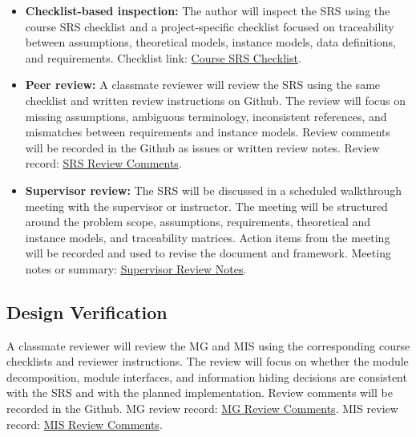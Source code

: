 \documentclass[12pt, titlepage]{article}
\begin{document}
\begin{itemize}
    \item \textbf{Checklist-based inspection:} The author will inspect the SRS using the course SRS checklist and a project-specific checklist focused on traceability between assumptions, theoretical models, instance models, data definitions, and requirements.  
    Checklist link: \href{https://github.com/Krozix-2026/cas741-speech-trf/tree/main/docs/Checklists}{Course SRS Checklist}.

    \item \textbf{Peer review:} A classmate reviewer will review the SRS using the same checklist and written review instructions on Github. The review will focus on missing assumptions, ambiguous terminology, inconsistent references, and mismatches between requirements and instance models. Review comments will be recorded in the Github as issues or written review notes.   
    Review record: \href{https://github.com/Krozix-2026/cas741-speech-trf/issues}{SRS Review Comments}.

    \item \textbf{Supervisor review:} The SRS will be discussed in a scheduled walkthrough meeting with the supervisor or instructor. The meeting will be structured around the problem scope, assumptions, requirements, theoretical and instance models, and traceability matrices. Action items from the meeting will be recorded and used to revise the document and framework.  
    Meeting notes or summary: \href{https://docs.google.com/document/d/1MB4mZMU3GUZd5zrZ7lYlEK12WPLXRYUR8ijGftzUFMo/edit?tab=t.0}{Supervisor Review Notes}.
\end{itemize}







\subsection{Design Verification}




A classmate reviewer will review the MG and MIS using the corresponding course checklists and reviewer instructions. The review will focus on whether the module decomposition, module interfaces, and information hiding decisions are consistent with the SRS and with the planned implementation. Review comments will be recorded in the Github.  
MG review record: \href{https://github.com/Krozix-2026/cas741-speech-trf/issues}{MG Review Comments}.  
MIS review record: \href{https://github.com/Krozix-2026/cas741-speech-trf/issues}{MIS Review Comments}.
\end{document}
